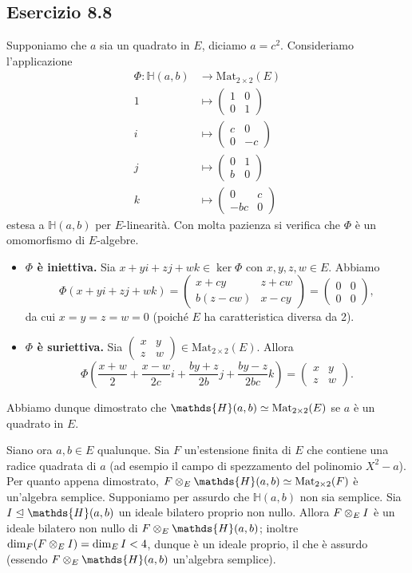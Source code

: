 \documentclass[a4paper]{article}
\newcommand*{\HH}{\mathds{H}}
\newcommand*{\Mat}{\text{Mat}_{2\times2}}
\newcommand*{\mattwo}[4]{\begin{pmatrix}#1&#2\\#3&#4\end{pmatrix}}
\begin{document}
\subsection*{Esercizio 8.8}
Supponiamo che $a$ sia un quadrato in $E$, diciamo $a=c^2$. Consideriamo l'applicazione
\begin{align*}
\Phi:\HH(a,b)&\longrightarrow\Mat(E)\\
1&\longmapsto\mattwo{1}{0}{0}{1}\\
i&\longmapsto\mattwo{c}{0}{0}{-c}\\
j&\longmapsto\mattwo{0}{1}{b}{0}\\
k&\longmapsto\mattwo{0}{c}{-bc}{0}
\end{align*}
estesa a $\HH(a,b)$ per $E$-linearità. Con molta pazienza si verifica che $\Phi$ è un omomorfismo di $E$-algebre.
\begin{itemize}
\item \textbf{$\Phi$ è iniettiva.} Sia $x+yi+zj+wk\in\ker\Phi$ con $x,y,z,w\in E$. Abbiamo
$$
\Phi(x+yi+zj+wk)=\mattwo{x+cy}{z+cw}{b(z-cw)}{x-cy}=\mattwo{0}{0}{0}{0},
$$
da cui $x=y=z=w=0$ (poiché $E$ ha caratteristica diversa da 2).
\item \textbf{$\Phi$ è suriettiva.} Sia $\mattwo{x}{y}{z}{w}\in\Mat(E)$. Allora
$$
\Phi\left(\frac{x+w}{2}+\frac{x-w}{2c}i+\frac{by+z}{2b}j+\frac{by-z}{2bc}k\right)=\mattwo{x}{y}{z}{w}.
$$
\end{itemize}
Abbiamo dunque dimostrato che $\HH(a,b)\iso\Mat(E)$ se $a$ è un quadrato in $E$.

Siano ora $a,b\in E$ qualunque. Sia $F$ un'estensione finita di $E$ che contiene una radice quadrata di $a$ (ad esempio il campo di spezzamento del polinomio $X^2-a$). Per quanto appena dimostrato, $F\tensor_E\HH(a,b)\iso\Mat(F)$ è un'algebra semplice. Supponiamo per assurdo che $\HH(a,b)$ non sia semplice. Sia $I\ideal\HH(a,b)$ un ideale bilatero proprio non nullo. Allora $F\otimes_E I$ è un ideale bilatero  non nullo di $F\tensor_E\HH(a,b)$; inoltre $\dim_F(F\otimes_E I)=\dim_E I<4$, dunque è un ideale proprio, il che è assurdo (essendo $F\tensor_E\HH(a,b)$ un'algebra semplice).
\end{document}
